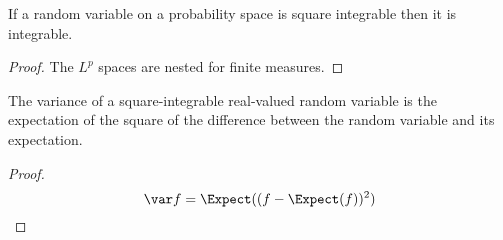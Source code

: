 \begin{prop}
  If a random
  variable on a probability
  space is square integrable
  then it is integrable.
  \begin{proof}
    The $L^p$ spaces are nested
    for finite measures.
  \end{proof}
\end{prop}

\begin{prop}
The variance of a
square-integrable
real-valued random
variable is
the expectation
of the square of
the difference between
the random variable
and its expectation.
\begin{proof}
\[
  \var f = \Expect((f - \Expect(f))^2)
\]
\end{proof}
\end{prop}
\strats

